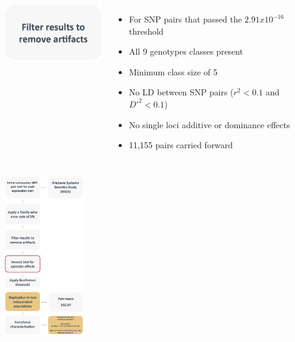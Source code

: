 \documentclass{beamer}
\begin{document}
\begin{frame}
\begin{columns}[c]
\includegraphics[width=4.5cm]{images/filter.png} \\
\begin{itemize}
\item For SNP pairs that passed the $2.91x10^{-16}$ threshold
\vspace{0.1cm} 
\item All 9 genotypes classes present
\vspace{0.1cm} 
\item Minimum class size of 5
\vspace{0.1cm} 
\item No LD between SNP pairs ($r^2 < 0.1$ and $D'^2 < 0.1$)
\vspace{0.1cm} 
\item No single loci additive or dominance effects
\vspace{0.1cm} 
\item 11,155 pairs carried forward
\end{itemize}
\end{columns}
\end{frame}

\begin{frame}
\begin{center}
\includegraphics[height=7cm]{images/methods6.png} \\
\end{center}
\end{frame}
\end{document}
